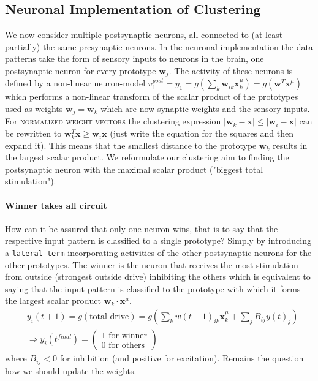 \documentclass[11pt]{article}
\newcommand\abs[1]{\left|#1\right|}
\begin{document}
\subsection{Neuronal Implementation of Clustering}
We now consider multiple postsynaptic neurons, all connected to (at least partially) the same presynaptic neurons.
In the neuronal implementation the data patterns take the form of sensory inputs to neurons in the brain, one postsynaptic neuron for every prototype $\mathbf{w}_j$. The activity of these neurons is defined by a non-linear neuron-model $v_1^{post}=y_1=g(\sum_k \mathbf{w}_{ik}\mathbf{x}_k^\mu)=g(\mathbf{w}^T\mathbf{x}^\mu)$ which performs a non-linear transform of the scalar product of the prototypes used as weights $\mathbf{w}_j=\mathbf{w}_k$ which are now synaptic weights and the sensory inputs.\\
For \textsc{normalized weight vectors} the clustering expression $\abs{\mathbf{w}_k-\mathbf{x}}\leq\abs{\mathbf{w}_i-\mathbf{x}}$ can be rewritten to $\mathbf{w}_k^T\mathbf{x}\geq\mathbf{w}_i\mathbf{x}$ (just write the equation for the squares and then expand it). This means that the smallest distance to the prototype $\mathbf{w}_k$ results in the largest scalar product. We reformulate our clustering aim to finding the postsynaptic neuron with the maximal scalar product ("biggest total stimulation").

\paragraph{Winner takes all circuit}
How can it be assured that only one neuron wins, that is to say that the respective input pattern is classified to a single prototype? Simply by introducing a \texttt{lateral term} incorporating activities of the other postsynaptic neurons for the other prototypes. The winner is the neuron that receives the most stimulation from outside (strongest outside drive) inhibiting the others which is equivalent to saying that the input pattern is classified to the prototype with which it forms the largest scalar product $\mathbf{w}_k\cdot\mathbf{x}^\mu$.
\begin{align*}
&y_i(t+1)=g(\text{total drive})=g(\sum_k w(t+1)_{ik}\mathbf{x}_k^\mu+\sum_j B_{ij}y(t)_j)\\
&\Rightarrow y_i(t^{final})=\left( \begin{array}{cc} \text{1 for winner}\\\text{0 for others}\end{array} \right)
\end{align*}
where $B_{ij}<0$ for inhibition (and positive for excitation).
Remains the question how we should update the weights.
\end{document}
